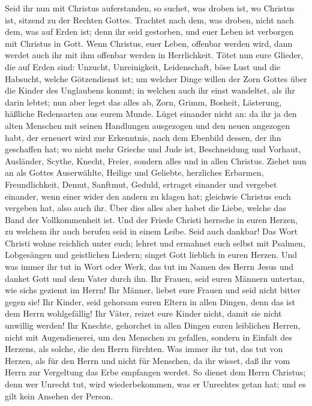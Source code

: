  Seid ihr nun mit Christus auferstanden, so suchet, was
droben ist, wo Christus ist, sitzend zu der Rechten Gottes.
 Trachtet nach dem, was droben, nicht nach dem, was auf
Erden ist;  denn ihr seid gestorben, und euer Leben ist
verborgen mit Christus in Gott.  Wenn Christus, euer
Leben, offenbar werden wird, dann werdet auch ihr mit ihm offenbar
werden in Herrlichkeit.  Tötet nun eure Glieder, die auf
Erden sind: Unzucht, Unreinigkeit, Leidenschaft, böse Lust und die
Habsucht, welche Götzendienst ist;  um welcher Dinge
willen der Zorn Gottes über die Kinder des Unglaubens kommt;
 in welchen auch ihr einst wandeltet, als ihr darin
lebtet;  nun aber leget das alles ab, Zorn, Grimm,
Bosheit, Lästerung, häßliche Redensarten aus eurem Munde. 
Lüget einander nicht an: da ihr ja den alten Menschen mit seinen
Handlungen ausgezogen  und den neuen angezogen habt, der
erneuert wird zur Erkenntnis, nach dem Ebenbild dessen, der ihn
geschaffen hat;  wo nicht mehr Grieche und Jude ist,
Beschneidung und Vorhaut, Ausländer, Scythe, Knecht, Freier, sondern
alles und in allen Christus.  Ziehet nun an als Gottes
Auserwählte, Heilige und Geliebte, herzliches Erbarmen, Freundlichkeit,
Demut, Sanftmut, Geduld,  ertraget einander und vergebet
einander, wenn einer wider den andern zu klagen hat; gleichwie Christus
euch vergeben hat, also auch ihr.  Über dies alles aber
habet die Liebe, welche das Band der Vollkommenheit ist. 
Und der Friede Christi herrsche in euren Herzen, zu welchem ihr auch
berufen seid in einem Leibe. Seid auch dankbar!  Das Wort
Christi wohne reichlich unter euch; lehret und ermahnet euch selbst mit
Psalmen, Lobgesängen und geistlichen Liedern; singet Gott lieblich in
euren Herzen.  Und was immer ihr tut in Wort oder Werk,
das tut im Namen des Herrn Jesus und danket Gott und dem Vater durch
ihn.  Ihr Frauen, seid euren Männern untertan, wie
sich\textquotesingle s geziemt im Herrn!  Ihr Männer,
liebet eure Frauen und seid nicht bitter gegen sie!  Ihr
Kinder, seid gehorsam euren Eltern in allen Dingen, denn das ist dem
Herrn wohlgefällig!  Ihr Väter, reizet eure Kinder nicht,
damit sie nicht unwillig werden!  Ihr Knechte, gehorchet
in allen Dingen euren leiblichen Herren, nicht mit Augendienerei, um den
Menschen zu gefallen, sondern in Einfalt des Herzens, als solche, die
den Herrn fürchten.  Was immer ihr tut, das tut von
Herzen, als für den Herrn und nicht für Menschen,  da ihr
wisset, daß ihr vom Herrn zur Vergeltung das Erbe empfangen werdet. So
dienet dem Herrn Christus;  denn wer Unrecht tut, wird
wiederbekommen, was er Unrechtes getan hat; und es gilt kein Ansehen der
Person.

